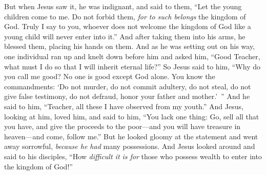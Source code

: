 \begin{biblechapter}
\verse But when Jesus saw it, he was indignant, and said to them, “Let the young children come to me. Do not forbid them, \textit{for to such belongs} the kingdom of God.
\verse Truly I say to you, whoever does not welcome the kingdom of God like a young child will never enter into it.”
\verse And after taking them into his arms, he blessed them, placing his hands on them.
 And as he was setting out on his way, one individual ran up and knelt down before him and asked him, “Good Teacher, what must I do so that I will inherit eternal life?”
\verse So Jesus said to him, “Why do you call me good? No one is good except God alone.
\verse You know the commandments: ‘Do not murder, do not commit adultery, do not steal, do not give false testimony, do not defraud, honor your father and mother.’ ”
\verse And he said to him, “Teacher, all these I have observed from my youth.”
\verse And Jesus, looking at him, loved him, and said to him, “You lack one thing: Go, sell all that you have, and give the proceeds to the poor—and you will have treasure in heaven—and come, follow me.”
\verse But he looked gloomy at the statement and went away sorrowful, \textit{because he had} many possessions.
\verse And Jesus looked around and said to his disciples, “How \textit{difficult it is for} those who possess wealth to enter into the kingdom of God!”

\end{biblechapter}
